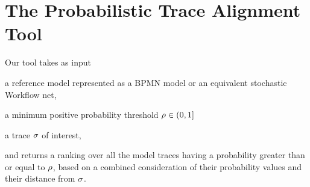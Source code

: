 
\section{The Probabilistic Trace Alignment Tool}
Our tool takes as input
\begin{inparaenum}[\it (i)]
	\item a reference model represented as a BPMN model or an equivalent stochastic Workflow net,
	\item a minimum positive probability threshold $\rho \in (0,1]$
	\item a trace $\sigma$ of interest,
\end{inparaenum}
and returns a ranking over all the model traces having a probability greater than or equal to $\rho$, based on a combined consideration of their probability values and their distance from $\sigma$.

